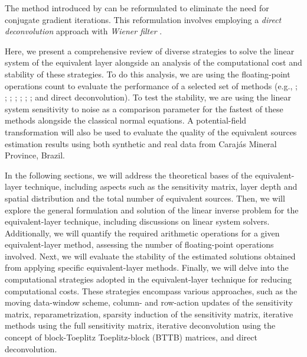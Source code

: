 The method introduced by \citet{takahashi-etal2020,takahashi-etal2022} can be reformulated to eliminate the need for conjugate gradient iterations. 
This reformulation involves employing a \textit{direct deconvolution} approach \citep[e.g.,][p. 220]{aster_etal2019} with 
\textit{Wiener filter} \citep[e.g.,][p. 263]{gonzalez-woods2002}.

Here, we present a comprehensive review of diverse strategies to solve the linear system of the equivalent layer alongside an analysis 
of the computational cost and stability of these strategies. 
To do this analysis, we are using the floating-point operations count to evaluate the performance of 
a selected set of methods (e.g., \cite{leao-silva1989};  \cite{cordell1992};
\cite{oliveirajr-etal2013}; \cite{siqueira-etal2017}; \cite{mendonca2020}; \cite{takahashi-etal2020}; 
\cite{soler-uieda2021}; and direct deconvolution). 
To test the stability, we are using the linear system sensitivity to noise as a comparison parameter for the fastest of these methods alongside the classical normal equations. 
A potential-field transformation will also be used to evaluate the quality of the equivalent sources estimation results using both synthetic and real data from Carajás Mineral Province, Brazil.

In the following sections, we will address the theoretical bases of the equivalent-layer technique, including aspects such as the sensitivity matrix, layer depth and spatial distribution and the total number of equivalent sources. 
Then, we will explore the general formulation and solution of the linear inverse problem for the equivalent-layer technique, including discussions on linear system solvers. 
Additionally, we will quantify the required arithmetic operations for a given equivalent-layer method, assessing the number of floating-point operations involved. 
Next, we will evaluate the stability of the estimated solutions obtained from applying specific equivalent-layer methods.
Finally, we will delve into the computational strategies adopted in the equivalent-layer technique for reducing computational costs. 
These strategies encompass various approaches, such as the moving data-window scheme, column- and row-action updates of the sensitivity matrix, reparametrization, sparsity induction of the sensitivity matrix, iterative methods using the full sensitivity matrix, iterative deconvolution using the concept of block-Toeplitz Toeplitz-block (BTTB) matrices, and direct deconvolution.

